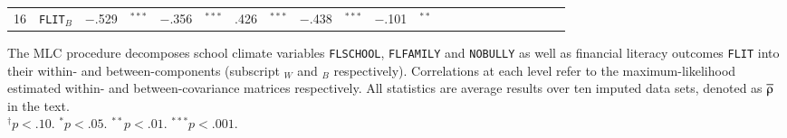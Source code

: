 {\begin{tabular}{cl r@{\hskip -0.1mm}l r@{\hskip -0.1mm}l r@{\hskip -0.1mm}l r@{\hskip -0.1mm}l r@{\hskip -0.1mm}l r@{\hskip -0.1mm}l r@{\hskip -0.1mm}l r@{\hskip -0.1mm}l r@{\hskip -0.1mm}l r@{\hskip -0.1mm}l}
            16    & \texttt{FLIT}$_B$  & \cellcolor[rgb]{ 1,  .471,  .471}$-.$529 & $^{***}$ & \cellcolor[rgb]{ 1,  .643,  .643}$-.$356 & $^{***}$ & \cellcolor[rgb]{ .576,  .576,  1}.426 & $^{***}$ & \cellcolor[rgb]{ 1,  .561,  .561}$-.$438 & $^{***}$ & \cellcolor[rgb]{ 1,  .898,  .898}$-.$101 & $^{**}$ &       &       &       &       &       &       &       &       &       &  \\
        \cmidrule[0.08em]{1-14}
      \end{tabular}
}{The MLC procedure decomposes school climate variables \texttt{FLSCHOOL}, \texttt{FLFAMILY} and \texttt{NOBULLY} as well as financial literacy outcomes \texttt{FLIT} into their within- and between-components (subscript $_W$ and $_B$ respectively). Correlations at each level refer to the maximum-likelihood estimated within- and between-covariance matrices respectively. All statistics are average results over ten imputed data sets, denoted as $\lbar{\rho}$ in the text.\\
$^\dagger p < .10$. $^* p < .05$. $^{**} p < .01$. $^{***} p < .001$.}
